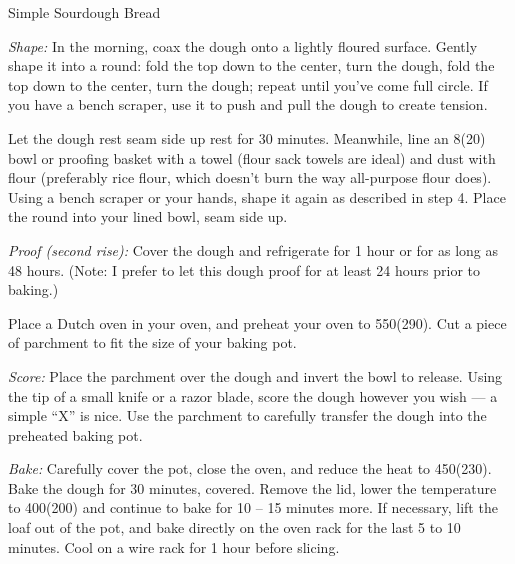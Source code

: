 \begin{recipe}[\vegan]{Simple Sourdough Bread}
\begin{instructions}
        \emph{Shape:}
        In the morning, coax the dough onto a lightly floured surface.
        Gently shape it into a round: fold the top down to the center, turn the dough, fold the top down to the center, turn the dough; repeat until you’ve come full circle.
        If you have a bench scraper, use it to push and pull the dough to create tension.

        Let the dough rest seam side up rest for 30 minutes.
        Meanwhile, line an 8\inch (20\cm) bowl or proofing basket with a towel (flour sack towels are ideal) and dust with flour (preferably rice flour, which doesn’t burn the way all-purpose flour does).
        Using a bench scraper or your hands, shape it again as described in step 4.
        Place the round into your lined bowl, seam side up.

        \emph{Proof (second rise):} Cover the dough and refrigerate for 1 hour or for as long as 48 hours. (Note: I prefer to let this dough proof for at least 24 hours prior to baking.)  

        Place a Dutch oven in your oven, and preheat your oven to 550\degF (290\degC).
        Cut a piece of parchment to fit the size of your baking pot.

        \emph{Score:}
        Place the parchment over the dough and invert the bowl to release.
        Using the tip of a small knife or a razor blade, score the dough however you wish — a simple “X” is nice.
        Use the parchment to carefully transfer the dough into the preheated baking pot.

        \emph{Bake:}
        Carefully cover the pot, close the oven, and reduce the heat to 450\degF (230\degC).
        Bake the dough for 30 minutes, covered.
        Remove the lid, lower the temperature to 400\degF (200\degC) and continue to bake for 10 – 15 minutes more.
        If necessary, lift the loaf out of the pot, and bake directly on the oven rack for the last 5 to 10 minutes.
        Cool on a wire rack for 1 hour before slicing.
    \end{instructions}
\end{recipe}
